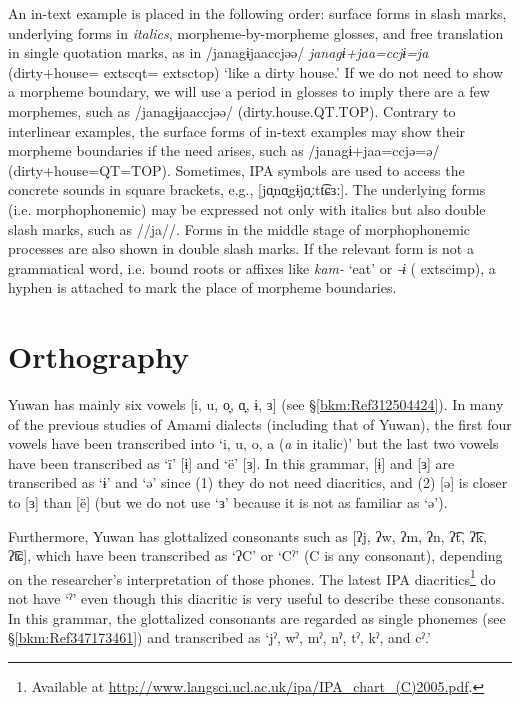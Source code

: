 An in-text example is placed in the following order: surface forms in slash marks, underlying forms in \textit{italics}, morpheme-by-morpheme glosses, and free translation in single quotation marks, as in /janagɨjaaccjəə/ \textit{janagɨ+jaa=ccjɨ=ja} (dirty+house=	extsc{qt}=	extsc{top}) ‘like a dirty house.’ If we do not need to show a morpheme boundary, we will use a period in glosses to imply there are a few morphemes, such as /janagɨjaaccjəə/ (dirty.house.QT.TOP). Contrary to interlinear examples, the surface forms of in-text examples may show their morpheme boundaries if the need arises, such as /janagɨ+jaa=ccjə=ə/ (dirty+house=QT=TOP). Sometimes, IPA symbols are used to access the concrete sounds in square brackets, e.g., [jɑ̟nɑ̟gɨjɑ̟ːtt͡ɕɜː]. The underlying forms (i.e. morphophonemic) may be expressed not only with italics but also double slash marks, such as //ja//. Forms in the middle stage of morphophonemic processes are also shown in double slash marks. If the relevant form is not a grammatical word, i.e. bound roots or affixes like \textit{kam-} ‘eat’ or \textit{{}-ɨ} (	extsc{imp}), a hyphen is attached to mark the place of morpheme boundaries.

\section*{Orthography}

Yuwan has mainly six vowels [i, u, o̞, ɑ̟, ɨ, ɜ] (see §\ref{bkm:Ref312504424}). In many of the previous studies of Amami dialects (including that of Yuwan), the first four vowels have been transcribed into ‘i, u, o, a (\textit{a} in italic)’ but the last two vowels have been transcribed as ‘ï’ [ɨ] and ‘ë’ [ɜ]. In this grammar, [ɨ] and [ɜ] are transcribed as ‘ɨ’ and ‘ə’ since (1) they do not need diacritics, and (2) [ə] is closer to [ɜ] than [ë] (but we do not use ‘ɜ’ because it is not as familiar as ‘ə’).

Furthermore, Yuwan has glottalized consonants such as [ʔj, ʔw, ʔm, ʔn, ʔ͡t, ʔ͡k, ʔ͡ʨ], which have been transcribed as ‘ʔC’ or ‘Cˀ’ (C is any consonant), depending on the researcher’s interpretation of those phones. The latest IPA diacritics\footnote{Available at \url{http://www.langsci.ucl.ac.uk/ipa/IPA\_chart\_(C)2005.pdf}.} do not have ‘ˀ’ even though this diacritic is very useful to describe these consonants. In this grammar, the glottalized consonants are regarded as single phonemes (see §\ref{bkm:Ref347173461}) and transcribed as ‘jˀ, wˀ, mˀ, nˀ, tˀ, kˀ, and cˀ.’

